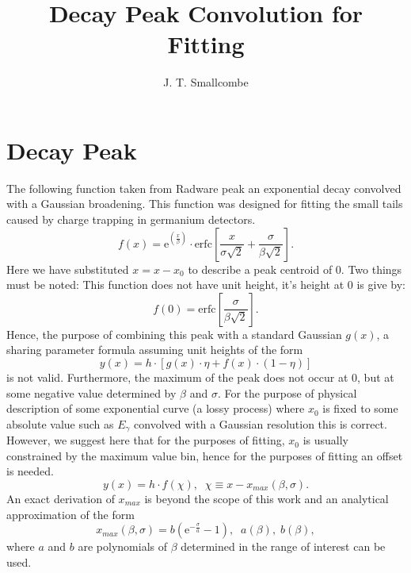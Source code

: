 \documentclass[a4paper,10pt]{article}
\title{Decay Peak Convolution for Fitting}
\author{J. T. Smallcombe}
\begin{document}
\maketitle

\section{Decay Peak}\label{sec:decpeak}
The following function taken from Radware peak an exponential decay convolved with a Gaussian broadening.
This function was designed for fitting the small tails caused by charge trapping in germanium detectors.
\begin{equation}\label{eq:raw}
f(x) = 
\mathrm{e}^{\left(\frac{x}{\beta}\right)} 
\cdot
\mathrm{erfc}\left[
\frac{x}{\sigma\sqrt{2}}
+
\frac{\sigma}{\beta\sqrt{2}}
\right].
\end{equation}
Here we have substituted $x=x-x_0$ to describe a peak centroid of 0.
Two things must be noted:
This function does not have unit height, it's height at 0 is give by:
\begin{equation}
f(0) = 
\mathrm{erfc}\left[
\frac{\sigma}{\beta\sqrt{2}}
\right].
\end{equation}
Hence, the purpose of combining this peak with a standard Gaussian $g(x)$, a sharing parameter formula assuming unit heights of the form
\begin{equation}\label{eq:comb1}
y(x) = h \cdot 
\left[
g(x) \cdot\eta
+
f(x)
\cdot(1-\eta)\right]
\end{equation}
is not valid. Furthermore, the maximum of the peak does not occur at 0, but at some negative value determined by $\beta$ and $\sigma$.
For the purpose of physical description of some exponential curve (a lossy process) where $x_0$ is fixed to some absolute value such as $E_\gamma$ convolved with a Gaussian resolution this is correct.
However, we suggest here that for the purposes of fitting, $x_0$ is usually constrained by the maximum value bin,
hence for the purposes of fitting an offset is needed.
\begin{equation}
y(x) = h \cdot f(\chi)
,\;\;
\chi\equiv x-x_{max}(\beta,\sigma).
\end{equation}
An exact derivation of $x_{max}$ is beyond the scope of this work and an analytical approximation of the form
\begin{equation}\label{eq:xmax}
x_{max}(\beta,\sigma) =
b\left(\mathrm{e}^{-\frac{\sigma}{a}}-1\right),\;\;a(\beta),\;b(\beta),
\end{equation}
where $a$ and $b$ are polynomials of $\beta$ determined in the range of interest can be used.
\end{document}
